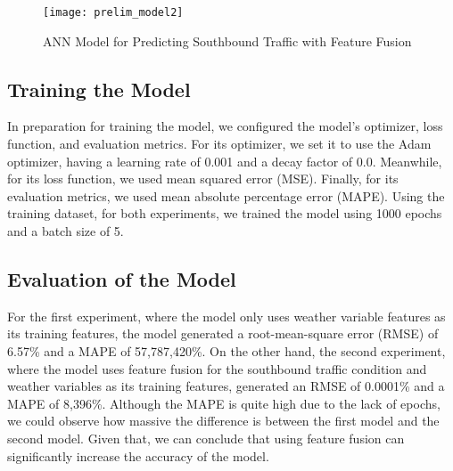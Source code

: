 \begin{figure}[!t]
\caption{ANN Model for Predicting Southbound Traffic with Feature Fusion}
\centering
\texttt{[image: prelim\_model2]}
\label{prelim_model2}
\end{figure}


\subsection{Training the Model}
In preparation for training the model, we configured the model’s optimizer, loss function, and evaluation metrics. For its optimizer, we set it to use the Adam optimizer, having a learning rate of 0.001 and a decay factor of 0.0. Meanwhile, for its loss function, we used mean squared error (MSE). Finally, for its evaluation metrics, we used mean absolute percentage error (MAPE). Using the training dataset, for both experiments, we trained the model using 1000 epochs and a batch size of 5. 



\subsection{Evaluation of the Model}
For the first experiment, where the model only uses weather variable features as its training features, the model generated a root-mean-square error (RMSE) of 6.57\% and a MAPE of 57,787,420\%. On the other hand, the second experiment, where the model uses feature fusion for the southbound traffic condition and weather variables as its training features, generated an RMSE of 0.0001\% and a MAPE of 8,396\%. Although the MAPE is quite high due to the lack of epochs, we could observe how massive the difference is between the first model and the second model. Given that, we can conclude that using feature fusion can significantly increase the accuracy of the model.
